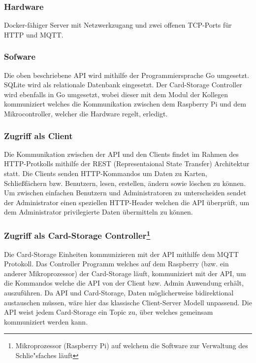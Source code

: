\documentclass[a4paper]{article}
\begin{document}
\subsubsection{Hardware}
Docker-fähiger Server mit Netzwerkzugang und zwei offenen TCP-Ports für HTTP und MQTT.

\subsubsection{Sofware}
Die oben beschriebene API wird mithilfe der Programmiersprache Go umgesetzt. SQLite wird als relationale Datenbank eingesetzt. Der Card-Storage Controller wird ebenfalls in Go umgesetzt, wobei dieser mit dem Modul der Kollegen kommuniziert welches die Kommunikation zwischen dem Raspberry Pi und dem Mikrocontroller, welcher die Hardware regelt, erledigt.

\subsubsection{Zugriff als Client}
Die Kommunikation zwischen der API und den Clients findet im Rahmen des HTTP-Protkolls mithilfe der REST (Representaional State Transfer) Architektur statt. Die Clients senden HTTP-Kommandos um Daten zu Karten, Schließfächern bzw. Benutzern, lesen, erstellen, ändern sowie löschen zu können. Um zwischen einfachen Benutzern und Administratoren zu unterscheiden sendet der Administrator einen speziellen HTTP-Header welchen die API überprüft, um dem Administrator privilegierte Daten übermitteln zu können.   

\subsubsection[Zugriff als Card-Storage Controller]{Zugriff als Card-Storage Controller\protect\footnote{Mikroprozessor (Raspberry Pi) auf welchem die Software zur Verwaltung des Schlie"sfaches läuft}}
Die Card-Storage Einheiten kommunizieren mit der API mithilfe dem MQTT Protokoll. Das Controller Programm welches auf dem Raspberry (bzw. ein anderer Mikroprozessor) der Card-Storage läuft,
kommuniziert mit der API, um die Kommandos welche die API von der Client bzw. Admin Anwendung erhält, auszuführen. Da API und Card-Storage, Daten möglicherweise bidirektional austauschen müssen, wäre hier das klassische Client-Server Modell unpassend. Die API weist jedem Card-Storage ein Topic zu, über welches gemeinsam kommuniziert werden kann. 
\end{document}
